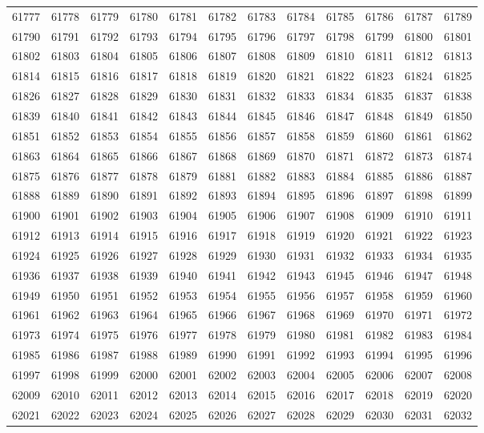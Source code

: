\begin{center}
\begin{longtable}{llllllllllll}
61777 &61778 &61779 &61780 &61781 &61782 &61783 &61784 &61785 &61786 &61787 &61789 \\
61790 &61791 &61792 &61793 &61794 &61795 &61796 &61797 &61798 &61799 &61800 &61801 \\
61802 &61803 &61804 &61805 &61806 &61807 &61808 &61809 &61810 &61811 &61812 &61813 \\
61814 &61815 &61816 &61817 &61818 &61819 &61820 &61821 &61822 &61823 &61824 &61825 \\
61826 &61827 &61828 &61829 &61830 &61831 &61832 &61833 &61834 &61835 &61837 &61838 \\
61839 &61840 &61841 &61842 &61843 &61844 &61845 &61846 &61847 &61848 &61849 &61850 \\
61851 &61852 &61853 &61854 &61855 &61856 &61857 &61858 &61859 &61860 &61861 &61862 \\
61863 &61864 &61865 &61866 &61867 &61868 &61869 &61870 &61871 &61872 &61873 &61874 \\
61875 &61876 &61877 &61878 &61879 &61881 &61882 &61883 &61884 &61885 &61886 &61887 \\
61888 &61889 &61890 &61891 &61892 &61893 &61894 &61895 &61896 &61897 &61898 &61899 \\
61900 &61901 &61902 &61903 &61904 &61905 &61906 &61907 &61908 &61909 &61910 &61911 \\
61912 &61913 &61914 &61915 &61916 &61917 &61918 &61919 &61920 &61921 &61922 &61923 \\
61924 &61925 &61926 &61927 &61928 &61929 &61930 &61931 &61932 &61933 &61934 &61935 \\
61936 &61937 &61938 &61939 &61940 &61941 &61942 &61943 &61945 &61946 &61947 &61948 \\
61949 &61950 &61951 &61952 &61953 &61954 &61955 &61956 &61957 &61958 &61959 &61960 \\
61961 &61962 &61963 &61964 &61965 &61966 &61967 &61968 &61969 &61970 &61971 &61972 \\
61973 &61974 &61975 &61976 &61977 &61978 &61979 &61980 &61981 &61982 &61983 &61984 \\
61985 &61986 &61987 &61988 &61989 &61990 &61991 &61992 &61993 &61994 &61995 &61996 \\
61997 &61998 &61999 &62000 &62001 &62002 &62003 &62004 &62005 &62006 &62007 &62008 \\
62009 &62010 &62011 &62012 &62013 &62014 &62015 &62016 &62017 &62018 &62019 &62020 \\
62021 &62022 &62023 &62024 &62025 &62026 &62027 &62028 &62029 &62030 &62031 &62032 \\

\end{longtable}
\end{center}
